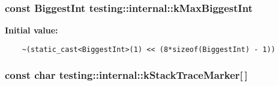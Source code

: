 \subsubsection{\setlength{\rightskip}{0pt plus 5cm}const {\bf BiggestInt} {\bf testing::internal::kMaxBiggestInt}}\label{namespacetesting_1_1internal_24166884965e4288f0b587c512f04b8f}


\textbf{Initial value:}

\begin{Code}\begin{verbatim}
    ~(static_cast<BiggestInt>(1) << (8*sizeof(BiggestInt) - 1))
\end{verbatim}
\end{Code}
\subsubsection{\setlength{\rightskip}{0pt plus 5cm}const char {\bf testing::internal::kStackTraceMarker}[$\,$]}\label{namespacetesting_1_1internal_564f5c46b13edecc1f4556cc06fea89a}


